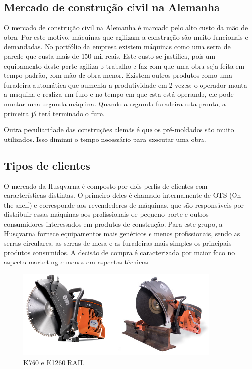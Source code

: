 \documentclass[12pt]{article}
\begin{document}
\subsection{Mercado de construção civil na Alemanha}

	O mercado de construção civil na Alemanha é marcado pelo alto custo da mão de obra. Por este motivo, máquinas que agilizam a construção são muito funcionais e demandadas. No portfólio da empresa existem máquinas como uma serra de parede que custa mais de 150 mil reais. Este custo se justifica, pois um equipamento deste porte agiliza o trabalho e faz com que uma obra seja feita em tempo padrão, com mão de obra menor. Existem outros produtos como uma furadeira automática que aumenta a produtividade em 2 vezes: o operador monta a máquina e realiza um furo e no tempo em que esta está operando, ele pode montar uma segunda máquina. Quando a segunda furadeira esta pronta, a primeira já terá terminado o furo.

	Outra peculiaridade das construções alemãs é que os pré-moldados são muito utilizados. Isso diminui o tempo necessário para executar uma obra.

\subsection{Tipos de clientes}

	O mercado da Husqvarna é composto por dois perfis de clientes com características distintas. O primeiro deles é chamado internamente de OTS (On-the-shelf) e corresponde aos revendedores de máquinas, que são responsáveis por distribuir essas máquinas aos profissionais de pequeno porte e outros consumidores interessados em produtos de construção. Para este grupo, a Husqvarna fornece equipamentos mais genéricos e menos profissionais, sendo as serras circulares, as serras de mesa e as furadeiras mais simples os principais produtos consumidos. A decisão de compra é caracterizada por maior foco no aspecto marketing e menos em aspectos técnicos.

\begin{figure}[h!]
	\centering
	\includegraphics[width=0.9\textwidth]{img/k760-vs-k1260rail.png}
	\caption{K760 e K1260 RAIL}
	\label{fig:k700vsk1260}
\end{figure}
\end{document}
